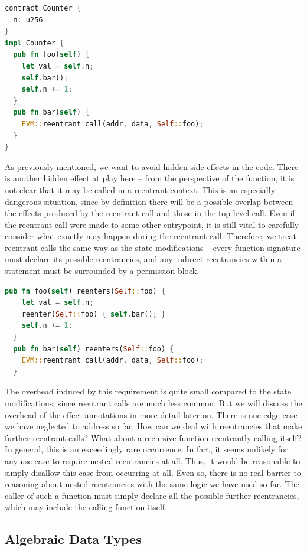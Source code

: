 \begin{lstlisting}[language=Rust, style=boxed]
contract Counter {
  n: u256
}
impl Counter {
  pub fn foo(self) {
    let val = self.n;
    self.bar();
    self.n += 1;
  }
  pub fn bar(self) {
    EVM::reentrant_call(addr, data, Self::foo);
  }
}
\end{lstlisting}
As previously mentioned, we want to avoid hidden side effects in the code. There is another hidden effect at play here -- from the perspective of the  function, it is not clear that it may be called in a reentrant context. This is an especially dangerous situation, since by definition there will be a possible overlap between the effects produced by the reentrant call and those in the top-level call. Even if the reentrant call were made to some other entrypoint, it is still vital to carefully consider what exactly may happen during the reentrant call. Therefore, we treat reentrant calls the same way as the state modifications -- every function signature must declare its possible reentrancies, and any indirect reentrancies within a statement must be surrounded by a permission block. \\
\begin{lstlisting}[language=Rust, style=boxed, firstnumber=5]
  pub fn foo(self) reenters(Self::foo) {
    let val = self.n;
    reenter(Self::foo) { self.bar(); }
    self.n += 1;
  }
  pub fn bar(self) reenters(Self::foo) {
    EVM::reentrant_call(addr, data, Self::foo);
  }
\end{lstlisting}
The overhead induced by this requirement is quite small compared to the state modifications, since reentrant calls are much less common. But we will discuss the overhead of the effect annotations in more detail later on. \newline
There is one edge case we have neglected to address so far. How can we deal with reentrancies that make further reentrant calls? What about a recursive function reentrantly calling itself? In general, this is an exceedingly rare occurrence. In fact, it seems unlikely for any use case to require nested reentrancies at all. Thus, it would be reasonable to simply disallow this case from occurring at all. Even so, there is no real barrier to reasoning about nested reentrancies with the same logic we have used so far. The caller of such a function must simply declare all the possible further reentrancies, which may include the calling function itself.

\subsection{Algebraic Data Types}

